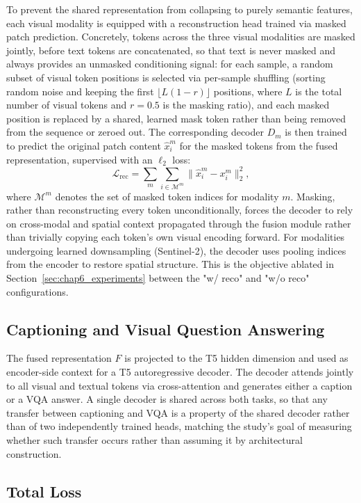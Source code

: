 To prevent the shared representation from collapsing to purely
semantic features, each visual modality is equipped with a
reconstruction head trained via masked patch prediction. Concretely,
tokens across the three visual modalities are masked jointly, before
text tokens are concatenated, so that text is never masked and always
provides an unmasked conditioning signal: for each sample, a random
subset of visual token positions is selected via per-sample shuffling
(sorting random noise and keeping the first $\lfloor L(1-r)\rfloor$
positions, where $L$ is the total number of visual tokens and $r =
0.5$ is the masking ratio), and each masked position is replaced by a
shared, learned mask token rather than being removed from the
sequence or zeroed out.
The corresponding decoder $D_m$ is then trained to predict the
original patch content $\hat{x}^{m}_i$ for the masked tokens from the
fused representation, supervised with an $\ell_2$ loss:
\[
\mathcal{L}_{\text{rec}} = \sum_{m} \sum_{i \in \mathcal{M}^m}
\| \hat{x}^{m}_i - x^{m}_i \|_2^2,
\]
where $\mathcal{M}^m$ denotes the set of masked token indices for
modality $m$. Masking, rather than reconstructing every token
unconditionally, forces the decoder to rely on cross-modal and
spatial context propagated through the fusion module rather than
trivially copying each token's own visual encoding forward. For
modalities undergoing learned downsampling (Sentinel-2), the decoder
uses pooling indices from the encoder to restore spatial structure.
This is the objective ablated in
Section~\ref{sec:chap6_experiments} between the "w/ reco" and "w/o
reco" configurations.

\subsection{Captioning and Visual Question Answering}
\label{sec:chap6_method_decoding}

The fused representation $F$ is projected to the T5 hidden dimension
and used as encoder-side context for a T5 autoregressive decoder. The
decoder attends jointly to all visual and textual tokens via
cross-attention and generates either a caption or a VQA answer. A
single decoder is shared across both tasks, so that any transfer
between captioning and VQA is a property of the shared decoder rather
than of two independently trained heads, matching the study's goal of
measuring whether such transfer occurs rather than assuming it by
architectural construction.

\subsection{Total Loss}
\label{sec:chap6_method_loss}

